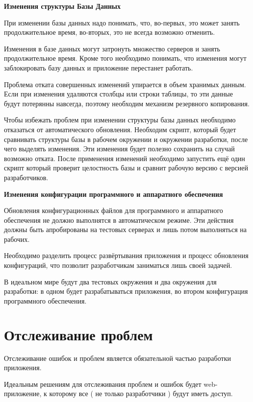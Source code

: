 \textbf{ Изменения структуры Базы Данных } %

При изменении базы данных надо понимать, что, во-первых, это может занять продолжительное время, во-вторых, это не всегда возможно отменить.

Изменения в базе данных могут затронуть множество серверов и занять продолжительное время. Кроме того необходимо понимать, что изменения могут заблокировать базу данных и приложение перестанет работать.

Проблема отката совершенных изменений упирается в объем хранимых данным. Если при изменения удаляются столбцы или строки таблицы, то эти данные будут потерянны навсегда, поэтому необходим механизм резервного копирования.

Чтобы избежать проблем при изменении структуры базы данных необходимо отказаться от автоматического обновления. Необходим скрипт, который будет сравнивать структуры базы в рабочем окружении и окружении разработки, после чего выделять изменения. Эти изменения будет полезно сохранить на случай возможно отката.  После применения изменений необходимо запустить ещё один скрипт который проверит целостность базы и сравнит рабочую версию с версией разработчиков.


\textbf{ Изменения конфигурации программного и аппаратного обеспечения }%

Обновления конфигурационных файлов для программного и аппаратного обеспечения не должно выполнятся в автоматическом режиме. Эти действия должны быть апробированы на тестовых серверах и лишь потом выполняться на рабочих.

Необходимо разделить процесс развёртывания приложения и процесс обновления конфигураций, что позволит разработчикам заниматься лишь своей задачей.

В идеальном мире будут два тестовых окружения и два окружения для разработки: в одном будет разрабатываться приложения, во втором конфигурация программного обеспечения.

\section{ Отслеживание проблем } \label{sect2_14}

Отслеживание ошибок и проблем является обязательной частью разработки приложения.


Идеальным решениям для отслеживания проблем и ошибок будет web-приложение, к которому все ( не только разработчики ) будут иметь доступ. 

